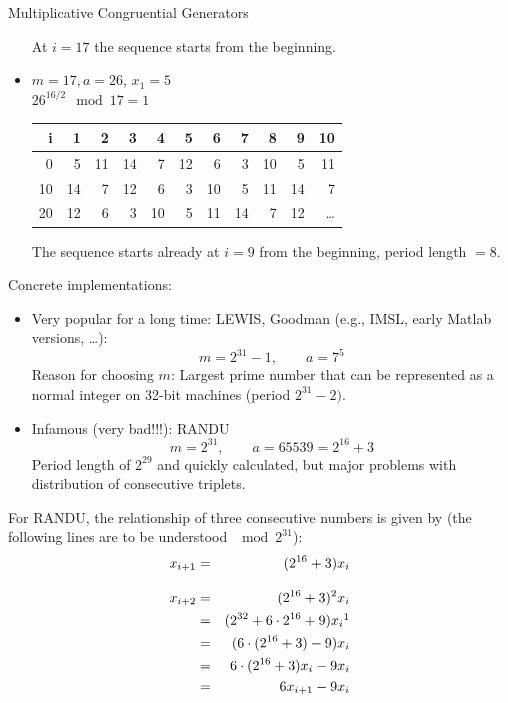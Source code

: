 \documentclass[11pt,compress,t,notes=noshow, xcolor=table]{beamer}
\begin{document}
\begin{vbframe}{Multiplicative Congruential Generators}
\begin{itemize}
At $i=17$ the sequence starts from the beginning.


\item  $m=17, a=26$, $x_1 = 5$ \\
$26^{16/2} \mod 17 = 1$

\begin{table}
\begin{footnotesize}
\centering
\begin{tabular}{r|rrrrrrrrrr}
  \hline
i & 1 & 2 & 3 & 4 & 5 & 6 & 7 & 8 & 9 & 10 \\
  \hline
0 & \cellcolor{orange}5 & 11 & 14 & 7 & 12 & 6 & 3 & 10 & \cellcolor{orange}5 & 11 \\
  10 & 14 & 7 & 12 & 6 & 3 & 10 & \cellcolor{orange}5 & 11 & 14 & 7 \\
  20 & 12 & 6 & 3 & 10 & \cellcolor{orange}5 & 11 & 14 & 7 & 12 &  \ldots \\
   \hline
\end{tabular}
\end{footnotesize}
\end{table}

The sequence starts already at $i = 9$ from the beginning, period length $=8$.

\end{itemize}

\framebreak

Concrete implementations:
\begin{itemize}
 \item Very popular for a long time: LEWIS, Goodman (e.g., IMSL, early Matlab versions, \ldots):
    $$
      m=2^{31}-1, \qquad a=7^5
    $$
    Reason for choosing $m$: Largest prime number that can be represented as a normal integer on 32-bit machines (period $2^{31} - 2)$.
 \item Infamous (very bad!!!): RANDU
    $$
    m=2^{31}, \qquad a = 65539 = 2^{16}+3
    $$
    Period length of $2^{29}$ and quickly calculated, but major problems with distribution of
    consecutive triplets.
\end{itemize}

\framebreak

For RANDU, the relationship of three consecutive numbers is given by (the following lines are to be understood $\mod 2^{31}$):
\begin{eqnarray*}
x_{i + 1} &=& (2^{16} + 3) x_i \\[0.3cm]
x_{i + 2} &=& (2^{16} + 3)^2 x_i \\
          &=& (2^{32} + 6 \cdot 2^{16} + 9) x_i \footnotemark \\
          &=& (6 \cdot (2^{16} + 3) - 9) x_i \\
          &=& 6 \cdot (2^{16} + 3) x_i - 9 x_i \\
          &=& 6 x_{i + 1} - 9 x_i
\end{eqnarray*}


\end{vbframe}
\end{document}
